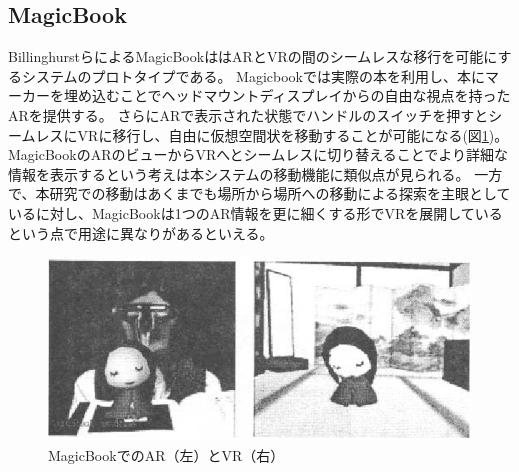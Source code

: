 \subsection{MagicBook}
BillinghurstらによるMagicBook\cite{10.1145/634067.634087}ははARとVRの間のシームレスな移行を可能にするシステムのプロトタイプである。
Magicbookでは実際の本を利用し、本にマーカーを埋め込むことでヘッドマウントディスプレイからの自由な視点を持ったARを提供する。
さらにARで表示された状態でハンドルのスイッチを押すとシームレスにVRに移行し、自由に仮想空間状を移動することが可能になる(図\ref{fig:MagicBook})。
MagicBookのARのビューからVRへとシームレスに切り替えることでより詳細な情報を表示するという考えは本システムの移動機能に類似点が見られる。
一方で、本研究での移動はあくまでも場所から場所への移動による探索を主眼としているに対し、MagicBookは1つのAR情報を更に細くする形でVRを展開しているという点で用途に異なりがあるといえる。


\begin{figure}[h]
  \centering 
  \includegraphics[width=120mm]{images/MagicBook.png}
  \caption{MagicBookでのAR（左）とVR（右）} \label{fig:MagicBook}
\end{figure}


